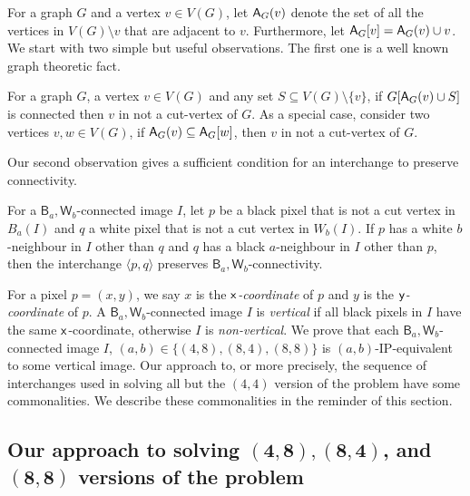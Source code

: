 \documentclass[lotsofwhite,charterfonts]{patmorin}
\newcommand{\x}{\ensuremath{\protect\textup{\textsf{x}}}}
\newcommand{\y}{\ensuremath{\protect\textup{\textsf{y}}}}
\newcommand{\ic}[2]{\langle #1,#2 \rangle}
\newcommand{\A}[2]{\ensuremath{\protect\textup{\textsf{A}}_{#2}(#1)}}
\newcommand{\AC}[2]{\ensuremath{\protect\textup{\textsf{A}}_{#2}[#1]}}
\newcommand{\sm}{\ensuremath{\setminus}}
\newcommand{\se}{\ensuremath{\subseteq}}
\begin{document}
For a graph $G$ and a vertex $v\in V(G)$, let \A{v}{G} denote the set
of all the vertices in $V(G)\sm v$ that are adjacent to $v$.
Furthermore, let  $\AC{v}{G}=\A{v}{G}\cup v$. We start with two simple
but useful observations. The first one is a well known graph theoretic
fact. 

\begin{obs}
For a graph $G$, a vertex $v\in V(G)$ and any set $S\se V(G)\sm
\{v\}$, if $G[\A{v}{G}\cup S]$ is connected then $v$ in not a
cut-vertex of $G$.  As a special case,  consider two vertices $v, w\in
V(G)$, if $\A{v}{G}\se \AC{w}{G}$, then $v$ in not a cut-vertex of
$G$.
\end{obs}

Our second observation gives a sufficient condition for an interchange
to preserve connectivity.

\begin{obs} 
For a $\textsf{B}_a,\textsf{W}_b$-connected image $I$, let $p$ be a
black pixel that is not a cut vertex in $B_a(I)$ and $q$ a white pixel
that is not a cut vertex in $W_b(I)$. If $p$ has a white $b$-neighbour
in $I$ other than $q$ and $q$ has a black $a$-neighbour in $I$ other
than $p$, then the interchange $\ic{p}{q}$ preserves
$\textsf{B}_a,\textsf{W}_b$-connectivity.  
\end{obs}


For a pixel $p=(x,y)$, we say $x$ is the \emph{\x-coordinate} of $p$
and $y$ is the \emph{\y-coordinate} of $p$. A
$\textsf{B}_a,\textsf{W}_b$-connected image $I$ is \emph{vertical} if
all black pixels in $I$ have the same \x-coordinate, otherwise $I$ is
\emph{non-vertical}. We prove that each
$\textsf{B}_a,\textsf{W}_b$-connected image $I$, $(a,b)\in \{(4,8),
(8,4), (8,8)\}$ is $(a,b)$-IP-equivalent to some vertical image. Our
approach to, or more precisely, the sequence of interchanges used in
solving  all but the $(4,4)$ version of the problem have some
commonalities.  We describe these commonalities in the reminder of
this section. 

\subsection{Our approach to solving $\mathbf{(4,8), (8,4)}$, and
$\mathbf{(8,8)}$ versions of the problem}
\end{document}
